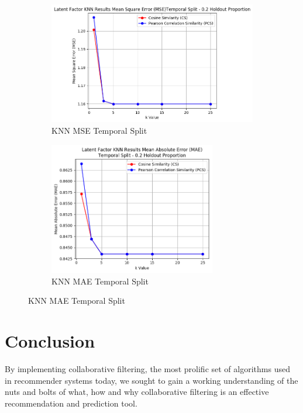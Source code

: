 \documentclass[10pt]{article}
\begin{document}
\begin{figure}[t]
	\begin{subfigure}{0.5\textwidth}
      \centering
      \includegraphics[width=1\textwidth]{KNN_MSE_Temporal_Split}
      \caption{KNN MSE Temporal Split}
      \label{fig:knn3}
    \end{subfigure}%
    \begin{subfigure}{0.5\textwidth}
      \centering
      \includegraphics[width=0.8\textwidth]{KNN_MAE_Temporal_Split}
      \caption{KNN MAE Temporal Split}
      \label{fig:knn4}
    \end{subfigure}
\end{figure}

\section{Conclusion}
By implementing collaborative filtering, the most prolific set of algorithms used in recommender systems today, we sought to gain a working understanding of the nuts and bolts of what, how and why collaborative filtering is an effective recommendation and prediction tool. 
\end{document}
